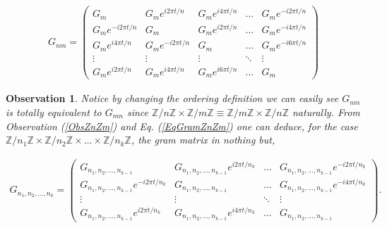 \documentclass[12pt,letterpaper]{article}
\newtheorem{observation}{Observation}
\begin{document}
\begin{align}\label{EqGramZnZm}
G_{nm}=\begin{pmatrix}
 G_m & G_me^{i2\pi t/n} & G_me^{i4\pi t/n} & \hdots &  G_me^{-i2\pi t/n} \\
  G_me^{-i2\pi t/n} & G_m & G_me^{i2\pi t/n} & \hdots & G_me^{-i4\pi t/n} \\
  G_me^{i4\pi t/n} &  G_me^{-i2\pi t/n}  & G_m & \hdots & G_me^{-i6\pi t/n}  \\
   \vdots & \vdots & \vdots & \ddots & \vdots \\
  G_me^{i2\pi t/n} &G_me^{i4\pi t/n}  & G_me^{i6\pi t/n}  & \hdots &  G_m 
\end{pmatrix}
\end{align}

\begin{multicols}{2}
\begin{observation}
Notice by changing the ordering definition we can easily see $G_{nm}$ is totally equivalent to $G_{mn}$ since $\mathbb{Z}/n\mathbb{Z}\times\mathbb{Z}/m\mathbb{Z}\equiv \mathbb{Z}/m\mathbb{Z}\times\mathbb{Z}/n\mathbb{Z}$ naturally. From Observation (\ref{ObsZnZm}) and Eq. (\ref{EqGramZnZm}) one can deduce, for the case $\mathbb{Z}/n_1\mathbb{Z}\times\mathbb{Z}/n_2\mathbb{Z}\times\dots\times \mathbb{Z}/n_k\mathbb{Z}$, the gram matrix in nothing but,
\end{observation}
\end{multicols}
\begin{align}
G_{n_1,n_2,...,n_k}=\begin{pmatrix}
 G_{n_1,n_2,...,n_{k-1}} & G_{n_1,n_2,...,n_{k-1}}e^{i2\pi t/n_k} & \hdots &  G_{n_1,n_2,...,n_{k-1}}e^{-i2\pi t/n_k} \\
  G_{n_1,n_2,...,n_{k-1}}e^{-i2\pi t/n_k} & G_{n_1,n_2,...,n_{k-1}} & \hdots & G_{n_1,n_2,...,n_{k-1}}e^{-i4\pi t/n_k} \\
   \vdots & \vdots  & \ddots & \vdots \\
  G_{n_1,n_2,...,n_{k-1}}e^{i2\pi t/n_k} & G_{n_1,n_2,...,n_{k-1}}e^{i4\pi t/n_k}  & \hdots &  G_{n_1,n_2,...,n_{k-1}} 
\end{pmatrix}.
\end{align}

\newpage



 
\end{document}
